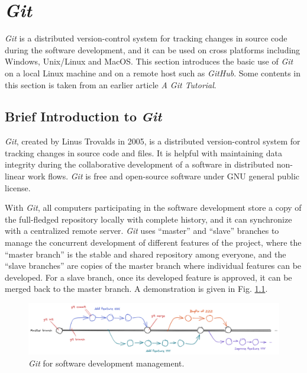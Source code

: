 \chapter{\textit{Git}}

\textit{Git} is a distributed version-control system for tracking changes in source code during the software development, and it can be used on cross platforms including Windows, Unix/Linux and MacOS. This section introduces the basic use of \textit{Git} on a local Linux machine and on a remote host such as \textit{GitHub}. Some contents in this section is taken from an earlier article \textit{A Git Tutorial}.

\section{Brief Introduction to \textit{Git}}

\textit{Git}, created by Linus Trovalds in 2005, is a distributed version-control system for tracking changes in source code and files. It is helpful with maintaining data integrity during the collaborative development of a software in distributed non-linear work flows. \textit{Git} is free and open-source software under GNU general public license.

With \textit{Git}, all computers participating in the software development store a copy of the full-fledged repository locally with complete history, and it can synchronize with a centralized remote server. \textit{Git} uses ``master'' and ``slave'' branches to manage the concurrent development of different features of the project, where the ``master branch'' is the stable and shared repository among everyone, and the ``slave branches'' are copies of the master branch where individual features can be developed. For a slave branch, once its developed feature is approved, it can be merged back to the master branch. A demonstration is given in Fig. \ref{ch:sma:fig:gitflow}.
\begin{figure}
	\centering
	\includegraphics[width=350pt]{chapters/ch-software-management-advanced/figures/gitflow.png}
	\caption{\textit{Git} for software development management.} \label{ch:sma:fig:gitflow}
\end{figure}


